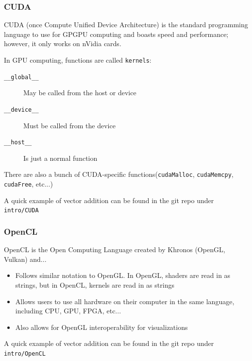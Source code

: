 \documentclass{beamer}
\begin{document}
\begin{frame}
\frametitle{CUDA}
\vspace{-0.5cm}

CUDA (once Compute Unified Device Architecture) is the standard programming language to use for GPGPU computing and boasts speed and performance; however, it only works on nVidia cards.

\vspace{0.5cm}
In GPU computing, functions are called \texttt{kernels}:
\begin{description}
\item [\texttt{\_\_global\_\_}] May be called from the host or device
\item [\texttt{\_\_device\_\_}] Must be called from the device
\item [\texttt{\_\_host\_\_}] Is just a normal function
\end{description}

There are also a bunch of CUDA-specific functions(\texttt{cudaMalloc}, \texttt{cudaMemcpy}, \texttt{cudaFree}, etc...)

\vspace{0.5cm}
A quick example of vector addition can be found in the git repo under \texttt{intro/CUDA}

\end{frame}

\begin{frame}
\frametitle{OpenCL}

OpenCL is the Open Computing Language created by Khronos (OpenGL, Vulkan) and...

\begin{itemize}
\item Follows similar notation to OpenGL. In OpenGL, shaders are read in as strings, but in OpenCL, kernels are read in as strings
\item Allows users to use all hardware on their computer in the same language, including CPU, GPU, FPGA, etc...
\item Also allows for OpenGL interoperability for visualizations
\end{itemize}

A quick example of vector addition can be found in the git repo under \texttt{intro/OpenCL}
\end{frame}
\end{document}
